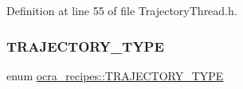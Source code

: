 Definition at line 55 of file Trajectory\+Thread.\+h.

\hypertarget{namespaceocra__recipes_a729e1c8304e390d16219eda5f9756152}{}\label{namespaceocra__recipes_a729e1c8304e390d16219eda5f9756152} 
\subsubsection{\texorpdfstring{T\+R\+A\+J\+E\+C\+T\+O\+R\+Y\+\_\+\+T\+Y\+PE}{TRAJECTORY\_TYPE}}
{\footnotesize\ttfamily enum \hyperlink{namespaceocra__recipes_a729e1c8304e390d16219eda5f9756152}{ocra\+\_\+recipes\+::\+T\+R\+A\+J\+E\+C\+T\+O\+R\+Y\+\_\+\+T\+Y\+PE}}

